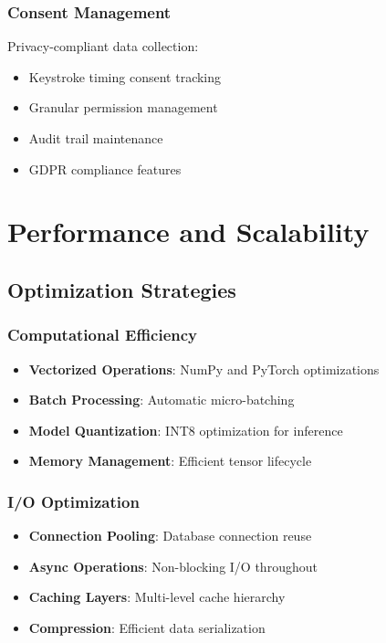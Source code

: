 \documentclass[12pt,a4paper]{article}
\begin{document}
\subsubsection{Consent Management}
Privacy-compliant data collection:
\begin{itemize}
    \item Keystroke timing consent tracking
    \item Granular permission management
    \item Audit trail maintenance
    \item GDPR compliance features
\end{itemize}

\section{Performance and Scalability}

\subsection{Optimization Strategies}

\subsubsection{Computational Efficiency}
\begin{itemize}
    \item \textbf{Vectorized Operations}: NumPy and PyTorch optimizations
    \item \textbf{Batch Processing}: Automatic micro-batching
    \item \textbf{Model Quantization}: INT8 optimization for inference
    \item \textbf{Memory Management}: Efficient tensor lifecycle
\end{itemize}

\subsubsection{I/O Optimization}
\begin{itemize}
    \item \textbf{Connection Pooling}: Database connection reuse
    \item \textbf{Async Operations}: Non-blocking I/O throughout
    \item \textbf{Caching Layers}: Multi-level cache hierarchy
    \item \textbf{Compression}: Efficient data serialization
\end{itemize}
\end{document}
